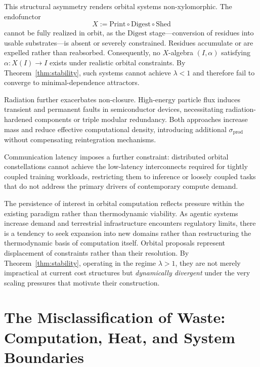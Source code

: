 \documentclass[11pt,a4paper]{article}
\theoremstyle{plain}
\theoremstyle{definition}
\theoremstyle{remark}
\begin{document}
This structural asymmetry renders orbital systems non-xylomorphic. The
endofunctor
\[
  X := \mathrm{Print} \circ \mathrm{Digest} \circ \mathrm{Shed}
\]
cannot be fully realized in orbit, as the $\mathrm{Digest}$ stage---conversion
of residues into usable substrates---is absent or severely constrained.
Residues accumulate or are expelled rather than reabsorbed. Consequently, no
$X$-algebra $(I,\alpha)$ satisfying $\alpha : X(I) \to I$ exists under
realistic orbital constraints. By Theorem~\ref{thm:stability}, such systems
cannot achieve $\lambda < 1$ and therefore fail to converge to
minimal-dependence attractors.

Radiation further exacerbates non-closure. High-energy particle flux induces
transient and permanent faults in semiconductor devices, necessitating
radiation-hardened components or triple modular redundancy. Both approaches
increase mass and reduce effective computational density, introducing additional
$\sigma_{\mathrm{prod}}$ without compensating reintegration mechanisms.

Communication latency imposes a further constraint: distributed orbital
constellations cannot achieve the low-latency interconnects required for
tightly coupled training workloads, restricting them to inference or loosely
coupled tasks that do not address the primary drivers of contemporary compute
demand.

The persistence of interest in orbital computation reflects pressure within the
existing paradigm rather than thermodynamic viability. As agentic systems
increase demand and terrestrial infrastructure encounters regulatory limits,
there is a tendency to seek expansion into new domains rather than
restructuring the thermodynamic basis of computation itself. Orbital proposals
represent displacement of constraints rather than their resolution. By
Theorem~\ref{thm:stability}, operating in the regime $\lambda > 1$, they are
not merely impractical at current cost structures but \emph{dynamically
divergent} under the very scaling pressures that motivate their construction.

\section{The Misclassification of Waste: Computation, Heat, and System Boundaries}
\label{sec:waste}
\end{document}

